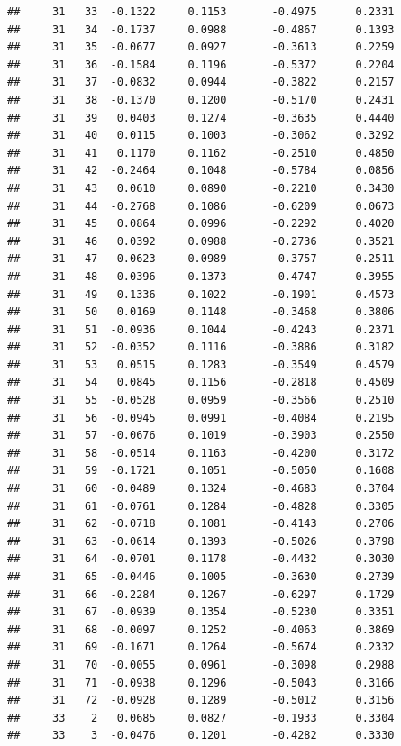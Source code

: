 \documentclass[
]{article}
\begin{document}
\begin{verbatim}
##     31   33  -0.1322     0.1153       -0.4975      0.2331 
##     31   34  -0.1737     0.0988       -0.4867      0.1393 
##     31   35  -0.0677     0.0927       -0.3613      0.2259 
##     31   36  -0.1584     0.1196       -0.5372      0.2204 
##     31   37  -0.0832     0.0944       -0.3822      0.2157 
##     31   38  -0.1370     0.1200       -0.5170      0.2431 
##     31   39   0.0403     0.1274       -0.3635      0.4440 
##     31   40   0.0115     0.1003       -0.3062      0.3292 
##     31   41   0.1170     0.1162       -0.2510      0.4850 
##     31   42  -0.2464     0.1048       -0.5784      0.0856 
##     31   43   0.0610     0.0890       -0.2210      0.3430 
##     31   44  -0.2768     0.1086       -0.6209      0.0673 
##     31   45   0.0864     0.0996       -0.2292      0.4020 
##     31   46   0.0392     0.0988       -0.2736      0.3521 
##     31   47  -0.0623     0.0989       -0.3757      0.2511 
##     31   48  -0.0396     0.1373       -0.4747      0.3955 
##     31   49   0.1336     0.1022       -0.1901      0.4573 
##     31   50   0.0169     0.1148       -0.3468      0.3806 
##     31   51  -0.0936     0.1044       -0.4243      0.2371 
##     31   52  -0.0352     0.1116       -0.3886      0.3182 
##     31   53   0.0515     0.1283       -0.3549      0.4579 
##     31   54   0.0845     0.1156       -0.2818      0.4509 
##     31   55  -0.0528     0.0959       -0.3566      0.2510 
##     31   56  -0.0945     0.0991       -0.4084      0.2195 
##     31   57  -0.0676     0.1019       -0.3903      0.2550 
##     31   58  -0.0514     0.1163       -0.4200      0.3172 
##     31   59  -0.1721     0.1051       -0.5050      0.1608 
##     31   60  -0.0489     0.1324       -0.4683      0.3704 
##     31   61  -0.0761     0.1284       -0.4828      0.3305 
##     31   62  -0.0718     0.1081       -0.4143      0.2706 
##     31   63  -0.0614     0.1393       -0.5026      0.3798 
##     31   64  -0.0701     0.1178       -0.4432      0.3030 
##     31   65  -0.0446     0.1005       -0.3630      0.2739 
##     31   66  -0.2284     0.1267       -0.6297      0.1729 
##     31   67  -0.0939     0.1354       -0.5230      0.3351 
##     31   68  -0.0097     0.1252       -0.4063      0.3869 
##     31   69  -0.1671     0.1264       -0.5674      0.2332 
##     31   70  -0.0055     0.0961       -0.3098      0.2988 
##     31   71  -0.0938     0.1296       -0.5043      0.3166 
##     31   72  -0.0928     0.1289       -0.5012      0.3156 
##     33    2   0.0685     0.0827       -0.1933      0.3304 
##     33    3  -0.0476     0.1201       -0.4282      0.3330 

\end{verbatim}
\end{document}
